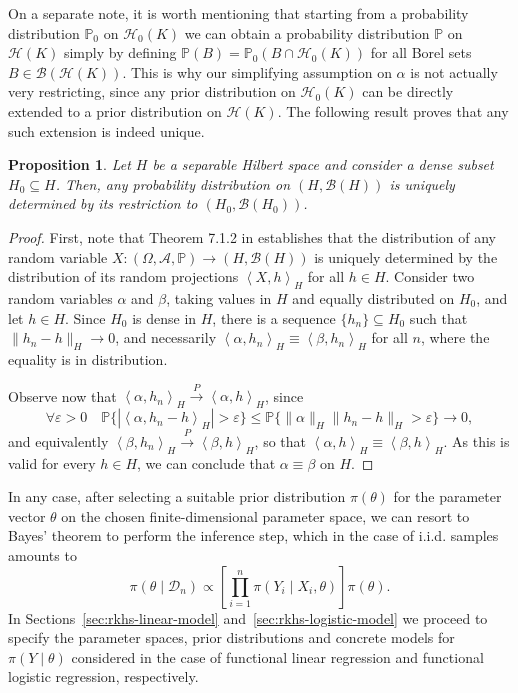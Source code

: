 \documentclass[ba]{imsart}
\numberwithin{equation}{section}
\theoremstyle{plain}
\newtheorem{prop}{Proposition}[section]
\renewcommand{\epsilon}{\varepsilon}
\newcommand\dotprod[2]{\left\langle #1, #2 \right\rangle}
\begin{document}
On a separate note, it is worth mentioning that starting from a probability distribution \(\mathbb{P}_0\) on \(\mathcal H_0(K)\) we can obtain a probability distribution \(\mathbb{P}\) on \(\mathcal H(K)\) simply by defining \(\mathbb{P}(B) = \mathbb{P}_0(B\cap \mathcal H_0(K))\) for all Borel sets \(B \in \mathcal B(\mathcal H(K))\). This is why our simplifying assumption on \(\alpha\) is not actually very restricting, since any prior distribution on \(\mathcal H_0(K)\) can be directly extended to a prior distribution on \(\mathcal H(K)\). The following result proves that any such extension is indeed unique.

\begin{prop} Let \(H\) be a separable Hilbert space and consider a dense subset \(H_0\subseteq H\). Then, any probability distribution on \((H, \mathcal{B}(H))\) is uniquely determined by its restriction to \((H_0, \mathcal B(H_0))\).
\end{prop}

\begin{proof}

First, note that Theorem 7.1.2 in \citet[p.~177]{hsing2015theoretical} establishes that the distribution of any random variable \(X: (\Omega, \mathcal A, \mathbb{P})\to (H, \mathcal B(H))\) is uniquely determined by the distribution of its random projections \(\dotprod{X}{h}_H\) for all \(h \in H\).
Consider two random variables \(\alpha\) and \(\beta\), taking values in \(H\) and equally distributed on \(H_0\), and let \(h \in H\). Since \(H_0\) is dense in \(H\), there is a sequence \(\{h_n\}\subseteq H_0\) such that \(\|h_n - h\|_H \to 0\), and necessarily \(\dotprod{\alpha}{h_n}_H \equiv \dotprod{\beta}{h_n}_H\) for all \(n\), where the equality is in distribution.

Observe now that \(\dotprod{\alpha}{h_n}_H \overset{P}{\to} \dotprod{\alpha}{h}_H\), since
\[
\forall \epsilon > 0 \quad \mathbb{P}\{|\dotprod{\alpha}{h_n - h}_H| > \epsilon\} \leq \mathbb{P}\{\|\alpha\|_H \|h_n - h\|_H > \epsilon\} \to 0,
\]
and equivalently \(\dotprod{\beta}{h_n}_H \overset{P}{\to} \dotprod{\beta}{h}_H\), so that \(\dotprod{\alpha}{h}_H \equiv \dotprod{\beta}{h}_H\). As this is valid for every \(h \in H\), we can conclude that \(\alpha \equiv \beta\) on \(H\).
\end{proof}

In any case, after selecting a suitable prior distribution \(\pi(\theta)\) for the parameter vector \(\theta\) on the chosen finite-dimensional parameter space, we can resort to Bayes' theorem to perform the inference step, which in the case of i.i.d. samples amounts to
\begin{equation}\label{eq:bayes-theorem}
  \pi(\theta \mid \mathcal D_n) \propto \left[ \prod_{i=1}^n \pi(Y_i\mid X_i, \theta) \right]\pi(\theta).
\end{equation}
In Sections~\ref{sec:rkhs-linear-model} and~\ref{sec:rkhs-logistic-model} we proceed to specify the parameter spaces, prior distributions and concrete models for \(\pi(Y\mid \theta)\) considered in the case of functional linear regression and functional logistic regression, respectively.
\end{document}
